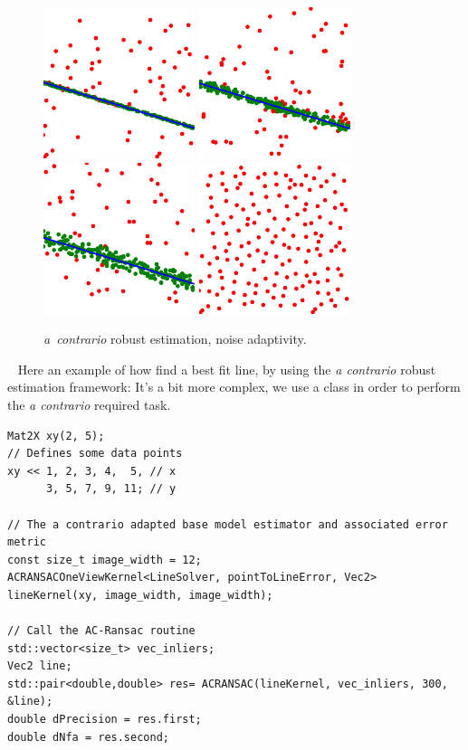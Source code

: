 \documentclass[11pt, letterpaper]{report}
\begin{document}
\begin{figure}[h!]
\begin{center}
\includegraphics[width=.2\linewidth]{figures/ac_ransac/0_3_line_robust}\hspace{1em}
\includegraphics[width=.2\linewidth]{figures/ac_ransac/1_8_line_robust}\hspace{1em}
\includegraphics[width=.2\linewidth]{figures/ac_ransac/2_7_line_robust}\hspace{1em}
\includegraphics[width=.2\linewidth]{figures/ac_ransac/tooNoisy_line_robust}\hfill
\caption{\emph{a~contrario} robust estimation, noise adaptivity.}
\end{center}
\end{figure}

~\newline
Here an example of how find a best fit line, by using the {\em a contrario} robust estimation framework:
It's a bit more complex, we use a class in order to perform the {\em a contrario} required task.

\vspace{-.5cm}
\begin{lstlisting}
Mat2X xy(2, 5);
// Defines some data points
xy << 1, 2, 3, 4,  5, // x 
      3, 5, 7, 9, 11; // y

// The a contrario adapted base model estimator and associated error metric
const size_t image_width = 12;
ACRANSACOneViewKernel<LineSolver, pointToLineError, Vec2> lineKernel(xy, image_width, image_width);

// Call the AC-Ransac routine
std::vector<size_t> vec_inliers;
Vec2 line;
std::pair<double,double> res= ACRANSAC(lineKernel, vec_inliers, 300, &line);
double dPrecision = res.first;
double dNfa = res.second;
\end{lstlisting}
\end{document}
